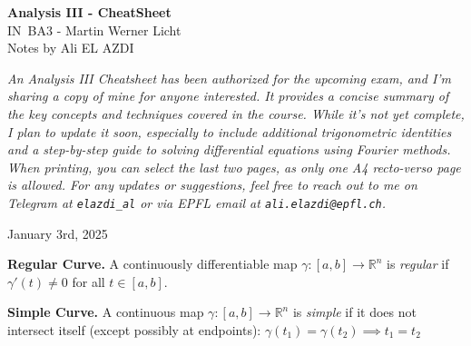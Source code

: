 \documentclass[8pt]{article}
\begin{document}
\begin{titlepage}
    \centering
    \vspace*{1cm}
    {\Huge \textbf{Analysis III - CheatSheet}} \\
    \vspace{10px}
    {\LARGE IN~BA3 - Martin Werner Licht} \\
    \vspace*{1cm}
    {\Large Notes by Ali EL AZDI} \\
    \vfill

    \begin{justify}
        \textit{An Analysis III Cheatsheet has been authorized for the upcoming exam, and I’m sharing a copy of mine for anyone interested. It provides a concise summary of the key concepts and techniques covered in the course. While it’s not yet complete, I plan to update it soon, especially to include additional trigonometric identities and a step-by-step guide to solving differential equations using Fourier methods. When printing, you can select the last two pages, as only one A4 recto-verso page is allowed. For any updates or suggestions, feel free to reach out to me on Telegram at \texttt{elazdi\_al} or via EPFL email at \texttt{ali.elazdi@epfl.ch}.}
    \end{justify}
    \vspace*{100px}

    {\large January 3rd, 2025}
    \vspace*{20px}
\end{titlepage}


\vspace*{-20px}
\noindent\textbf{Regular Curve.}
A continuously differentiable map
$\gamma : [a,b] \to \mathbb{R}^n$
is \emph{regular} if $\gamma'(t) \neq 0$ for all $t \in [a,b]$.

\smallskip
\noindent\textbf{Simple Curve.}
A continuous map
$\gamma : [a,b] \to \mathbb{R}^n$
is \emph{simple} if it does not intersect itself (except possibly at endpoints):
$\gamma(t_1) = \gamma(t_2) \implies t_1 = t_2$
\end{document}
